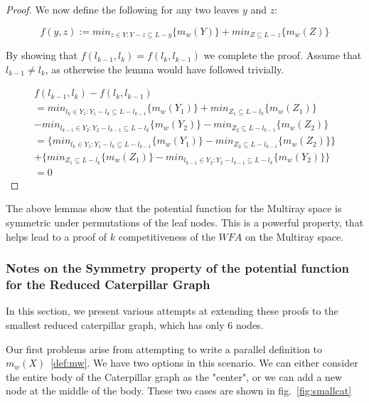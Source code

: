 \begin{proof}
    We now define the following for any two leaves $y$ and $z$: 

    \begin{equation*}
        f(y, z) := min_{z \in Y : Y - z \subseteq L-y} \{ m_w(Y)\} + min_{Z \subseteq L-z} \{ m_w(Z)\}
    \end{equation*}

    By showing that $f(l_{k-1}, l_k) = f(l_k, l_{k-1})$ we complete the proof.
    Assume that $l_{k-1} \neq l_k$, as otherwise the lemma would have followed trivially. 

    \begin{equation*}
        \begin{gathered}
        f(l_{k-1}, l_k) - f(l_k, l_{k-1})\\
        = min_{l_k \in Y_1 : Y_1 - l_k \subseteq L - l_{k-1}} \{ m_w(Y_1)\} + min_{Z_1 \subseteq L - l_k} \{ m_w(Z_1)\} \\
        - min_{l_{k-1} \in Y_2 : Y_2 - l_{k-1} \subseteq L - l_k} \{ m_w(Y_2)\} - min_{Z_2 \subseteq L - l_{k-1}} \{ m_w(Z_2)\} \\
        = \{ min_{l_k \in Y_1 : Y_1 - l_k \subseteq L - l_{k-1}} \{ m_w(Y_1)\} - min_{Z_2 \subseteq L - l_{k-1}} \{ m_w(Z_2)\}\}\\
        + \{min_{Z_1 \subseteq L - l_k} \{ m_w(Z_1)\} - min_{l_{k-1} \in Y_2 : Y_2 - l_{k-1} \subseteq L - l_k} \{ m_w(Y_2)\}\} \\ 
        = 0
        \end{gathered}
    \end{equation*}
\end{proof}

The above lemmas show that the potential function for the Multiray space is symmetric under permutations of the leaf nodes. This is a powerful property, that helps lead to a proof of $k$ competitiveness of the $WFA$ on the Multiray space.

\subsubsection*{Notes on the Symmetry property of the potential function for the Reduced Caterpillar Graph}

In this section, we present various attempts at extending these proofs to the smallest reduced caterpillar graph, which has only 6 nodes.

Our first problems arise from attempting to write a parallel definition to $m_w(X)$~\ref{def:mw}. We have two options in this scenario. We can either consider the entire body of the Caterpillar graph as the "center", or we can add a new node at the middle of the body. These two cases are shown in fig.~\ref{fig:smallcat}

